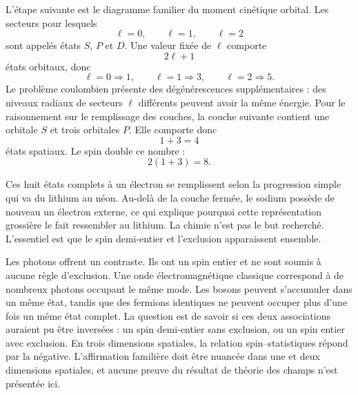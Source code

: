L’étape suivante est le diagramme familier du moment cinétique orbital. Les secteurs pour lesquels
\begin{equation}
\ell=0,\qquad \ell=1,\qquad \ell=2
\end{equation}
sont appelés états \(S\), \(P\) et \(D\). Une valeur fixée de \(\ell\) comporte
\begin{equation}
2\ell+1
\end{equation}
états orbitaux, donc
\begin{equation}
\ell=0\Rightarrow 1,
\qquad
\ell=1\Rightarrow 3,
\qquad
\ell=2\Rightarrow 5.
\end{equation}
Le problème coulombien présente des dégénérescences supplémentaires : des niveaux radiaux de secteurs \(\ell\) différents peuvent avoir la même énergie. Pour le raisonnement sur le remplissage des couches, la couche suivante contient une orbitale \(S\) et trois orbitales \(P\). Elle comporte donc
\begin{equation}
1+3=4
\end{equation}
états spatiaux. Le spin double ce nombre :
\begin{equation}
2(1+3)=8.
\end{equation}

Ces huit états complets à un électron se remplissent selon la progression simple qui va du lithium au néon. Au-delà de la couche fermée, le sodium possède de nouveau un électron externe, ce qui explique pourquoi cette représentation grossière le fait ressembler au lithium. La chimie n’est pas le but recherché. L’essentiel est que le spin demi-entier et l’exclusion apparaissent ensemble.

Les photons offrent un contraste. Ils ont un spin entier et ne sont soumis à aucune règle d’exclusion. Une onde électromagnétique classique correspond à de nombreux photons occupant le même mode. Les bosons peuvent s’accumuler dans un même état, tandis que des fermions identiques ne peuvent occuper plus d’une fois un même état complet. La question est de savoir si ces deux associations auraient pu être inversées : un spin demi-entier sans exclusion, ou un spin entier avec exclusion. En trois dimensions spatiales, la relation spin--statistiques répond par la négative. L’affirmation familière doit être nuancée dans une et deux dimensions spatiales, et aucune preuve du résultat de théorie des champs n’est présentée ici.

\begin{classroomqa}
\end{classroomqa}

